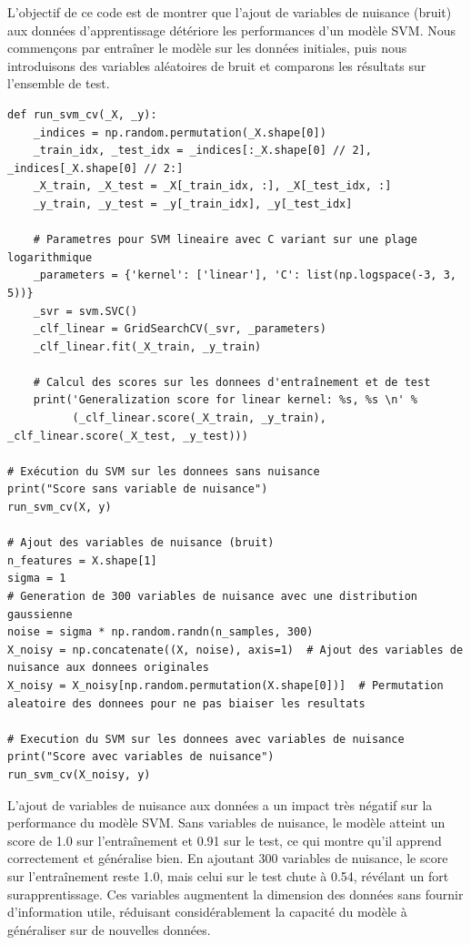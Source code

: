 \documentclass[12pt,a4paper]{report}
\begin{document}
L’objectif de ce code est de montrer que l’ajout de variables de nuisance 
(bruit) aux données d’apprentissage détériore les performances d’un modèle SVM. 
Nous commençons par entraîner le modèle sur les données initiales, puis nous 
introduisons des variables aléatoires de bruit et comparons les résultats sur 
l’ensemble de test.


\begin{lstlisting}
def run_svm_cv(_X, _y):
    _indices = np.random.permutation(_X.shape[0])
    _train_idx, _test_idx = _indices[:_X.shape[0] // 2], _indices[_X.shape[0] // 2:]
    _X_train, _X_test = _X[_train_idx, :], _X[_test_idx, :]
    _y_train, _y_test = _y[_train_idx], _y[_test_idx]

    # Parametres pour SVM lineaire avec C variant sur une plage logarithmique
    _parameters = {'kernel': ['linear'], 'C': list(np.logspace(-3, 3, 5))}
    _svr = svm.SVC()
    _clf_linear = GridSearchCV(_svr, _parameters)
    _clf_linear.fit(_X_train, _y_train)

    # Calcul des scores sur les donnees d'entraînement et de test
    print('Generalization score for linear kernel: %s, %s \n' %
          (_clf_linear.score(_X_train, _y_train), _clf_linear.score(_X_test, _y_test)))

# Exécution du SVM sur les donnees sans nuisance
print("Score sans variable de nuisance")
run_svm_cv(X, y)

# Ajout des variables de nuisance (bruit)
n_features = X.shape[1]
sigma = 1
# Generation de 300 variables de nuisance avec une distribution gaussienne
noise = sigma * np.random.randn(n_samples, 300)
X_noisy = np.concatenate((X, noise), axis=1)  # Ajout des variables de nuisance aux donnees originales
X_noisy = X_noisy[np.random.permutation(X.shape[0])]  # Permutation aleatoire des donnees pour ne pas biaiser les resultats

# Execution du SVM sur les donnees avec variables de nuisance
print("Score avec variables de nuisance")
run_svm_cv(X_noisy, y)
\end{lstlisting}

L’ajout de variables de nuisance aux données a un impact très négatif sur la performance du modèle SVM. Sans variables de nuisance, le modèle atteint un score de 1.0 sur l’entraînement et 0.91 sur le test, ce qui montre qu’il apprend correctement et généralise bien. En ajoutant 300 variables de nuisance, le score sur l’entraînement reste 1.0, mais celui sur le test chute à 0.54, révélant un fort surapprentissage. Ces variables augmentent la dimension des données sans fournir d’information utile, réduisant considérablement la capacité du modèle à généraliser sur de nouvelles données.
\end{document}
